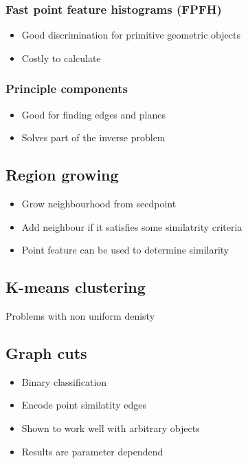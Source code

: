 		\subsubsection{Fast point feature histograms (FPFH)}
			\begin{itemize}
			\item Good discrimination for primitive geometric objects
			\item Costly to calculate
			\end{itemize}
			
		\subsubsection{Principle components}
			\begin{itemize}					
			\item Good for finding edges and planes
			\item Solves part of the inverse problem
			\end{itemize}
			

	\subsection{Region growing}
		\begin{itemize}
		\item Grow neighbourhood from seedpoint
		\item Add neighbour if it satisfies some similatrity criteria
		\item Point feature can be used to determine similarity
		\end{itemize}

	\subsection{K-means clustering}
		Problems with non uniform denisty

	\subsection{Graph cuts}
		\begin{itemize}
		\item Binary classification
		\item Encode point similatity edges
		\item Shown to work well with arbitrary objects
		\item Results are parameter dependend
		\end{itemize}

